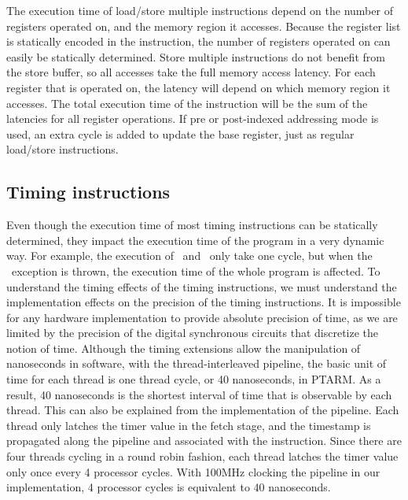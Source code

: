 The execution time of load/store multiple instructions depend on the number of registers operated on, and the memory region it accesses. 
Because the register list is statically encoded in the instruction, the number of registers operated on can easily be statically determined.
Store multiple instructions do not benefit from the store buffer, so all accesses take the full memory access latency.
For each register that is operated on, the latency will depend on which memory region it accesses. 
The total execution time of the instruction will be the sum of the latencies for all register operations. 
If pre or post-indexed addressing mode is used, an extra cycle is added to update the base register, just as regular load/store instructions. 

\subsection{Timing instructions}
Even though the execution time of most timing instructions can be statically determined, they impact the execution time of the program in a very dynamic way.
For example, the execution of \exceptiononexpire\ and \deactivateexception\ only take one cycle, but when the \timerexpired\ exception is thrown, the execution time of the whole program is affected. 
To understand the timing effects of the timing instructions, we must understand the implementation effects on the precision of the timing instructions.
It is impossible for any hardware implementation to provide absolute precision of time, as we are limited by the precision of the digital synchronous circuits that discretize the notion of time. 
Although the timing extensions allow the manipulation of nanoseconds in software, with the thread-interleaved pipeline, the basic unit of time for each thread is one thread cycle, or 40 nanoseconds, in PTARM.
As a result, 40 nanoseconds is the shortest interval of time that is observable by each thread.
This can also be explained from the implementation of the pipeline.
Each thread only latches the timer value in the fetch stage, and the timestamp is propagated along the pipeline and associated with the instruction. 
Since there are four threads cycling in a round robin fashion, each thread latches the timer value only once every 4 processor cycles. 
With 100MHz clocking the pipeline in our implementation, 4 processor cycles is  equivalent to 40 nanoseconds. 

